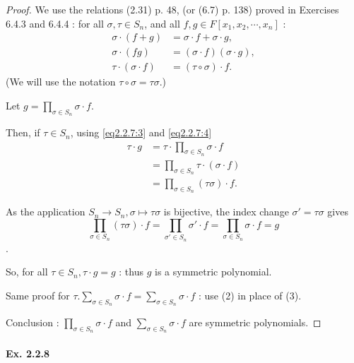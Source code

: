 \documentclass[11pt,a4paper]{article}
\begin{document}
\begin{proof}
We use the relations (2.31) p. 48, (or (6.7) p. 138) proved in Exercises 6.4.3 and 6.4.4 :  for all $\sigma,\tau \in S_n$, and all $f,g \in F[x_1,x_2,\cdots,x_n]$ : 
\begin{align}
\sigma \cdot (f+g) &= \sigma \cdot f + \sigma \cdot g, \label{eq2.2.7:2}\\
\sigma \cdot (fg) &= (\sigma \cdot f)(\sigma \cdot g),\label{eq2.2.7:3}\\
\tau\cdot (\sigma \cdot f) &= (\tau \circ \sigma) \cdot f.\label{eq2.2.7:4}
\end{align}
(We will use the notation $\tau \circ \sigma = \tau  \sigma$.)

Let $g = \prod_{\sigma \in S_n} \sigma \cdot f$.

Then, if $\tau \in S_n$, using \eqref{eq2.2.7:3} and \eqref{eq2.2.7:4}
\begin{align*}
\tau \cdot g &= \tau \cdot \prod_{\sigma \in S_n} \sigma \cdot f\\
&=\prod_{\sigma \in S_n}  \tau \cdot (\sigma \cdot f)\\
&=\prod_{\sigma \in S_n} (\tau \sigma) \cdot f.
\end{align*}

As the application $S_n \to S_n, \sigma \mapsto \tau \sigma$ is bijective, the index change $\sigma' = \tau \sigma$ gives 
$$\prod_{\sigma \in S_n} (\tau \sigma) \cdot f = \prod_{\sigma' \in S_n} \sigma' \cdot f = \prod_{\sigma \in S_n} \sigma \cdot f= g$$.

So,  for all $\tau \in S_n, \tau \cdot g = g$ : thus $g$ is a symmetric polynomial.

Same proof for $\tau. \sum _{\sigma \in S_n} \sigma \cdot f = \sum _{\sigma \in S_n} \sigma \cdot f $ : use (2) in place of (3).

Conclusion : $\prod\limits_{\sigma \in S_n} \sigma \cdot f$ and $\sum\limits_{\sigma \in S_n} \sigma \cdot f$ are symmetric polynomials.
\end{proof}

\paragraph{Ex. 2.2.8}
\end{document}

